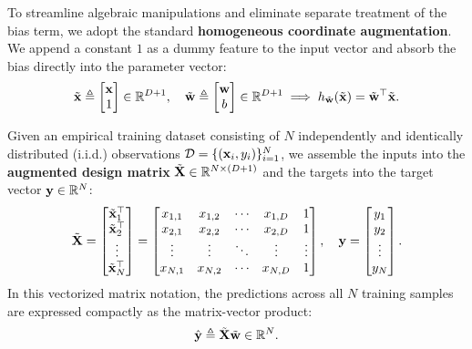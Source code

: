 To streamline algebraic manipulations and eliminate separate treatment of the bias term, we adopt the standard \textbf{homogeneous coordinate augmentation}. We append a constant $1$ as a dummy feature to the input vector and absorb the bias directly into the parameter vector:
\begin{equation}
\tilde{\mathbf{x}} \triangleq \begin{bmatrix} \mathbf{x} \\ 1 \end{bmatrix} \in \mathbb{R}^{D+1}, \quad
\tilde{\mathbf{w}} \triangleq \begin{bmatrix} \mathbf{w} \\ b \end{bmatrix} \in \mathbb{R}^{D+1}
\implies h_{\tilde{\mathbf{w}}}(\tilde{\mathbf{x}}) = \tilde{\mathbf{w}}^\top \tilde{\mathbf{x}}.
\label{eq:homogeneous_coords}
\end{equation}

Given an empirical training dataset consisting of $N$ independently and identically distributed (i.i.d.) observations $\mathcal{D} = \{(\mathbf{x}_i, y_i)\}_{i=1}^N$, we assemble the inputs into the \textbf{augmented design matrix} $\tilde{\mathbf{X}} \in \mathbb{R}^{N \times (D+1)}$ and the targets into the target vector $\mathbf{y} \in \mathbb{R}^N$:
\begin{equation}
\tilde{\mathbf{X}} = \begin{bmatrix} \tilde{\mathbf{x}}_1^\top \\ \tilde{\mathbf{x}}_2^\top \\ \vdots \\ \tilde{\mathbf{x}}_N^\top \end{bmatrix} = \begin{bmatrix} x_{1,1} & x_{1,2} & \cdots & x_{1,D} & 1 \\ x_{2,1} & x_{2,2} & \cdots & x_{2,D} & 1 \\ \vdots & \vdots & \ddots & \vdots & \vdots \\ x_{N,1} & x_{N,2} & \cdots & x_{N,D} & 1 \end{bmatrix}, \quad
\mathbf{y} = \begin{bmatrix} y_1 \\ y_2 \\ \vdots \\ y_N \end{bmatrix}.
\label{eq:design_matrix_def}
\end{equation}
In this vectorized matrix notation, the predictions across all $N$ training samples are expressed compactly as the matrix-vector product:
\begin{equation}
\hat{\mathbf{y}} \triangleq \tilde{\mathbf{X}}\tilde{\mathbf{w}} \in \mathbb{R}^N.
\label{eq:vectorized_predictions}
\end{equation}

